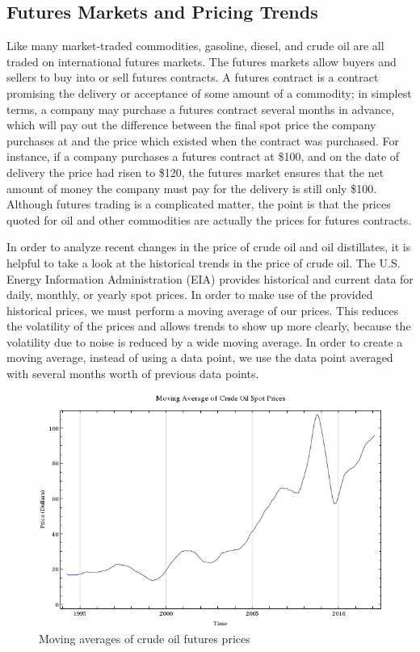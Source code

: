 \documentclass[11pt,twocolumn]{article}
\newcommand{\tab}[0] {\hspace*{24pt}}
\begin{document}
\onecolumn
\begin{multicols}{2}
\subsection*{Futures Markets and Pricing Trends}
\tab Like many market-traded commodities, gasoline, diesel, and crude oil are all traded on international futures markets. The futures markets allow buyers and sellers to buy into or sell futures contracts. A futures contract is a contract promising the delivery or acceptance of some amount of a commodity; in simplest terms, a company may purchase a futures contract several months in advance, which will pay out the difference between the final spot price the company purchases at and the price which existed when the contract was purchased. For instance, if a company purchases a futures contract at \$100, and on the date of delivery the price had risen to \$120, the futures market ensures that the net amount of money the company must pay for the delivery is still only \$100. Although futures trading is a complicated matter, the point is that the prices quoted for oil and other commodities are actually the prices for futures contracts.

\tab In order to analyze recent changes in the price of crude oil and oil distillates, it is helpful to take a look at the historical trends in the price of crude oil. The U.S. Energy Information Administration (EIA) provides historical and current data for daily, monthly, or yearly spot prices. In order to make use of the provided historical prices, we must perform a moving average of our prices. This reduces the volatility of the prices and allows trends to show up more clearly, because the volatility due to noise is reduced by a wide moving average. In order to create a moving average, instead of using a data point, we use the data point averaged with several months worth of previous data points.
\end{multicols}

\begin{figure}
    \centering
    \includegraphics[scale=0.68]{images/CrudeMovingAverage.png}\\
    Moving averages of crude oil futures prices
\end{figure}
\newpage
\end{document}
